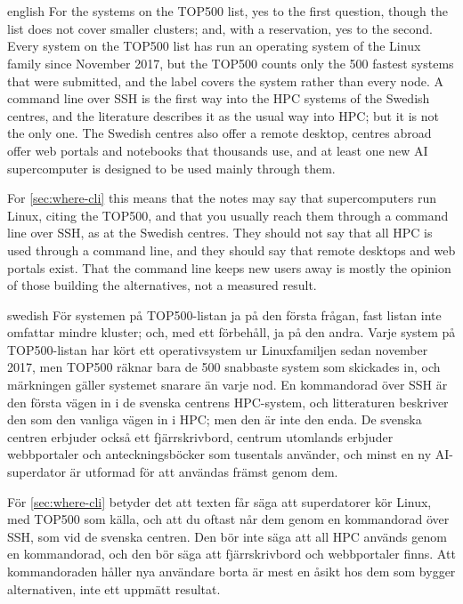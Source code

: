 \section{} %
\label{sec:hpc-cli-conclusion}

\begin{onlyin}{english} %
For the systems on the TOP500 list, yes to the first question, though
the list does not cover smaller clusters; and, with a reservation, yes
to the second.  Every system on the TOP500 list has run an operating system of
the Linux family
since November 2017, but the TOP500 counts only the 500 fastest systems
that were submitted, and the label covers the system rather than every
node.  A command line over SSH is the first way into the HPC systems of
the Swedish centres, and the literature describes it as the usual way
into HPC; but it is not the only one.  The Swedish centres also offer a
remote desktop, centres abroad offer web portals and notebooks that
thousands use, and at least one new AI supercomputer is designed to be
used mainly through them.

For \cref{sec:where-cli} this means that the notes may say that
supercomputers run Linux, citing the TOP500, and that you usually reach
them through a command line over SSH, as at the Swedish centres.  They
should not say that all HPC is used through a command line, and they
should say that remote desktops and web portals exist.  That the command
line keeps new users away is mostly the opinion of those building the
alternatives, not a measured result.
\end{onlyin}
\begin{onlyin}{swedish}
För systemen på TOP500-listan ja på den första frågan, fast listan
inte omfattar mindre kluster; och, med ett förbehåll, ja på den andra.  Varje
system på TOP500-listan har kört ett operativsystem ur Linuxfamiljen sedan
november 2017, men TOP500 räknar bara de 500 snabbaste system som
skickades in, och märkningen gäller systemet snarare än varje nod.  En
kommandorad över SSH är den första vägen in i de svenska centrens
HPC-system, och litteraturen beskriver den som den vanliga vägen in i
HPC; men den är inte den enda.  De svenska centren erbjuder också ett
fjärrskrivbord, centrum utomlands erbjuder webbportaler och
anteckningsböcker som
tusentals använder, och minst en ny AI-superdator är utformad för att
användas främst genom dem.

För \cref{sec:where-cli} betyder det att texten får säga att superdatorer
kör Linux, med TOP500 som källa, och att du oftast når dem genom en
kommandorad över SSH, som vid de svenska centren.  Den bör inte säga att
all HPC används genom en kommandorad, och den bör säga att
fjärrskrivbord och webbportaler finns.  Att kommandoraden håller nya
användare borta är mest en åsikt hos dem som bygger alternativen, inte
ett uppmätt resultat.
\end{onlyin}


